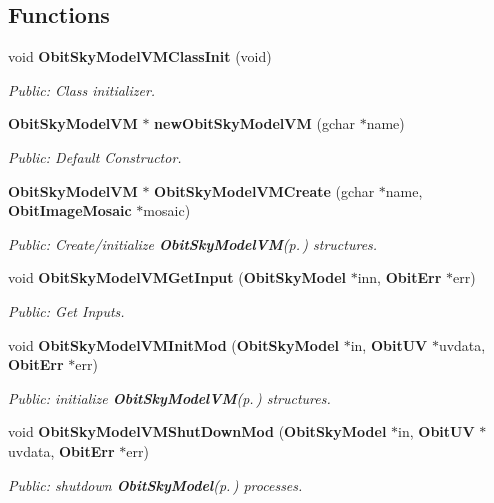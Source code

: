 \subsection*{Functions}
\begin{CompactItemize}
\item 
void {\bf Obit\-Sky\-Model\-VMClass\-Init} (void)
\begin{CompactList}\small\item\em Public: Class initializer. \item\end{CompactList}\item 
{\bf Obit\-Sky\-Model\-VM} $\ast$ {\bf new\-Obit\-Sky\-Model\-VM} (gchar $\ast$name)
\begin{CompactList}\small\item\em Public: Default Constructor. \item\end{CompactList}\item 
{\bf Obit\-Sky\-Model\-VM} $\ast$ {\bf Obit\-Sky\-Model\-VMCreate} (gchar $\ast$name, {\bf Obit\-Image\-Mosaic} $\ast$mosaic)
\begin{CompactList}\small\item\em Public: Create/initialize {\bf Obit\-Sky\-Model\-VM}{\rm (p.\,\pageref{structObitSkyModelVM})} structures. \item\end{CompactList}\item 
void {\bf Obit\-Sky\-Model\-VMGet\-Input} ({\bf Obit\-Sky\-Model} $\ast$inn, {\bf Obit\-Err} $\ast$err)
\begin{CompactList}\small\item\em Public: Get Inputs. \item\end{CompactList}\item 
void {\bf Obit\-Sky\-Model\-VMInit\-Mod} ({\bf Obit\-Sky\-Model} $\ast$in, {\bf Obit\-UV} $\ast$uvdata, {\bf Obit\-Err} $\ast$err)
\begin{CompactList}\small\item\em Public: initialize {\bf Obit\-Sky\-Model\-VM}{\rm (p.\,\pageref{structObitSkyModelVM})} structures. \item\end{CompactList}\item 
void {\bf Obit\-Sky\-Model\-VMShut\-Down\-Mod} ({\bf Obit\-Sky\-Model} $\ast$in, {\bf Obit\-UV} $\ast$uvdata, {\bf Obit\-Err} $\ast$err)
\begin{CompactList}\small\item\em Public: shutdown {\bf Obit\-Sky\-Model}{\rm (p.\,\pageref{structObitSkyModel})} processes. \item\end{CompactList}\item 

\end{CompactItemize}
